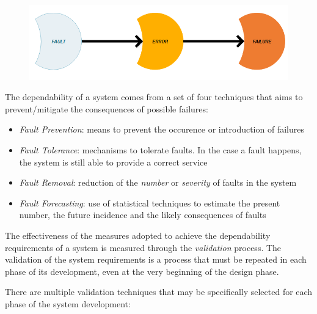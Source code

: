 \begin{figure}[h!]
	\includegraphics[width=\textwidth]{img/fault-error-failure.png}
	\caption{}
\end{figure}

The dependability of a system comes from a set of four techniques that aims to prevent/mitigate the consequences of possible failures:

\begin{itemize}
	\item \textsl{Fault Prevention}: means to prevent the occurence or introduction of failures
	\item \textsl{Fault Tolerance}: mechanisms to tolerate faults. In the case a fault happens, the system is still able to provide a correct service
	\item \textsl{Fault Removal}: reduction of the \textsl{number} or \textsl{severity} of faults in the system
	\item \textsl{Fault Forecasting}: use of statistical techniques to estimate the present number, the future incidence and the likely consequences of faults
\end{itemize}

The effectiveness of the measures adopted to achieve the dependability requirements of a system is measured through the \textsl{validation} process.
The validation of the system requirements is a process that must be repeated in each phase of its development, even at the very beginning of the design phase.

There are multiple validation techniques that may be specifically selected for each phase of the system development: \cite{bonda}

